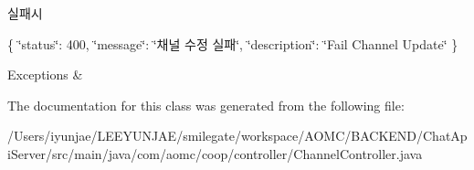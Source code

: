 실패시

\{ \char`\"{}status\char`\"{}\+: 400, \char`\"{}message\char`\"{}\+: \char`\"{}채널 수정 실패\char`\"{}, \char`\"{}description\char`\"{}\+: \char`\"{}\+Fail Channel Update\char`\"{} \}


\begin{DoxyExceptions}{Exceptions}
{\em } & \\
\hline
\end{DoxyExceptions}


The documentation for this class was generated from the following file\+:\begin{DoxyCompactItemize}
\item 
/\+Users/iyunjae/\+L\+E\+E\+Y\+U\+N\+J\+A\+E/smilegate/workspace/\+A\+O\+M\+C/\+B\+A\+C\+K\+E\+N\+D/\+Chat\+Api\+Server/src/main/java/com/aomc/coop/controller/Channel\+Controller.\+java\end{DoxyCompactItemize}

